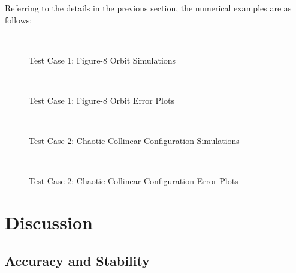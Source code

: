 \documentclass[a4paper,11pt]{article}
\begin{document}
Referring to the details in the previous section, the numerical examples are as follows:

\begin{figure}[H]
  \centering
  \quad
  \\
  \quad
  \caption{Test Case 1: Figure-8 Orbit Simulations}
\end{figure}

\begin{figure}[H]
  \centering
  \quad
  \\
  \quad
  \caption{Test Case 1: Figure-8 Orbit Error Plots}
\end{figure}

\begin{figure}[H]
  \centering
  \quad
  \\
  \quad
  \caption{Test Case 2: Chaotic Collinear Configuration Simulations}
\end{figure}

\begin{figure}[H]
  \centering
  \quad
  \\
  \quad
  \caption{Test Case 2: Chaotic Collinear Configuration  Error Plots}
\end{figure}

\section{Discussion}

\subsection{Accuracy and Stability}
\end{document}
